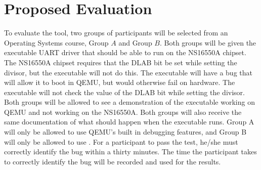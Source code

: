 


\section{Proposed Evaluation}



To evaluate the tool, two groups of participants will be selected from an Operating Systems course, Group $A$ and Group $B$.
%
Both groups will be given the executable UART\cite{6558126} driver that should be able to run on the NS16550A\cite{zhao2013} chipset.
%
The NS16550A chipset requires that the DLAB bit be set while setting the divisor, but the executable will not do this.
%
The executable will have a bug that will allow it to boot in QEMU, but would otherwise fail on hardware.
%
The executable will not check the value of the DLAB bit while setting the divisor.
%
Both groups will be allowed to see a demonstration of the executable working on QEMU and not working on the NS16550A.
%
Both groups will also receive the same documentation of what should happen when the executable runs.
%
Group A will only be allowed to use QEMU's built in debugging features, and Group B will only be allowed to use \tool{}.
%
For a participant to pass the test, he/she must correctly identify the bug within a thirty minutes.
%
The time the participant takes to correctly identify the bug will be recorded and used for the results.